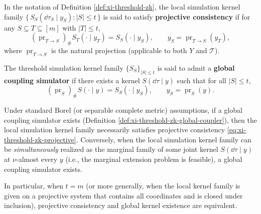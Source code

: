 \begin{definition}\label{def:xi-threshold-zk-projective-consistency}
In the notation of Definition \ref{def:xi-threshold-zk}, the local simulation kernel family
\(
\{\,S_S(\dd\tau_S\mid y_S):|S|\le t\,\}
\)
is said to satisfy \textbf{projective consistency} if for any \(S\subseteq T\subseteq[m]\) with \(|T|\le t\),
\begin{equation}\label{eq:xi-threshold-zk-projective}
\boxed{\;
(\operatorname{pr}_{T\to S})_{\#}S_T(\cdot\mid y_T)=S_S(\cdot\mid y_S),
\qquad y_S=\operatorname{pr}_{T\to S}(y_T),\;}
\end{equation}
where \(\operatorname{pr}_{T\to S}\) is the natural projection (applicable to both \(Y\) and \(\mathcal{T}\)).
\end{definition}

\begin{definition}\label{def:xi-threshold-zk-global-coupler}
The threshold simulation kernel family \(\{S_S\}_{|S|\le t}\) is said to admit a \textbf{global coupling simulator} if there exists a kernel
\(
S(\dd\tau\mid y)
\)
such that for all \(|S|\le t\),
\begin{equation}\label{eq:xi-threshold-zk-global-marginals}
\boxed{\;
(\operatorname{pr}_{S})_{\#}S(\cdot\mid y)=S_S(\cdot\mid y_S),
\qquad y_S=\operatorname{pr}_S(y).\;}
\end{equation}
\end{definition}

\begin{proposition}\label{prop:xi-threshold-zk-consistency-coupling}
Under standard Borel (or separable complete metric) assumptions, if a global coupling simulator exists (Definition \ref{def:xi-threshold-zk-global-coupler}), then the local simulation kernel family necessarily satisfies projective consistency \eqref{eq:xi-threshold-zk-projective}.
Conversely, when the local simulation kernel family can be \emph{simultaneously} realized as the marginal family of some joint kernel \(S(\dd\tau\mid y)\) at \(\nu\)-almost every \(y\) (i.e., the marginal extension problem is feasible), a global coupling simulator exists.
\par
In particular, when \(t=m\) (or more generally, when the local kernel family is given on a projective system that contains all coordinates and is closed under inclusion), projective consistency and global kernel existence are equivalent.
\end{proposition}

